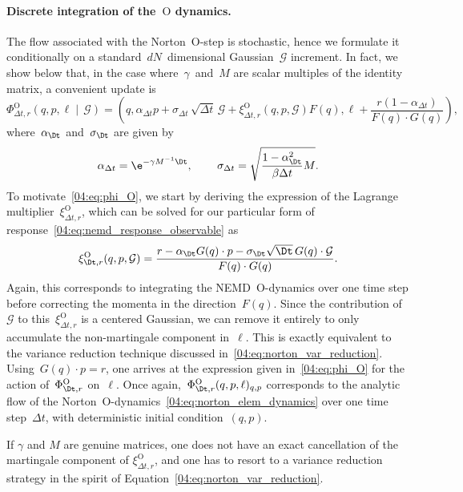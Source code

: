 \paragraph{Discrete integration of the~$\mathrm O$ dynamics.}
The flow associated with the Norton~$\mathrm{O}$-step is stochastic, hence we formulate it conditionally on a standard~$dN$~dimensional Gaussian~$\mathcal{G}$ increment. In fact, we show below that, in the case where~$\gamma$~and~$M$ are scalar multiples of the identity matrix, a convenient update is
\begin{equation}
    \label{04:eq:phi_O}
    {
    \Phi_{\Delta t,r}^{\mathrm{O}}
        \left(q,p,\ell \middle|\, \mathcal G \right)=
        \left(
        q,\alpha_{\Delta t}p + \sigma_{\Delta t}\,\sqrt{\Delta t}\, \mathcal{G} + \xi_{\Delta t,r}^{\mathrm{O}}(q,p,\mathcal G) F(q),\ell + \frac{r(1-\alpha_{\Delta t})}{F(q)\cdot G(q)}
        \right)}
    ,
\end{equation}
where~$\alpha_{\Dt}$ and~$\sigma_{\Dt}$ are given by \[\alpha_{\Delta t} = \e^{-\gamma M^{-1}\Dt},\,\qquad \sigma_{\Delta t} = \sqrt{\frac{1-\alpha_{\Dt}^2}{\beta\Delta t}M}.\]
To motivate~\eqref{04:eq:phi_O}, we start by deriving the expression of the Lagrange multiplier~$\xi_{\Delta t,r}^{\mathrm{O}}$, which can be solved for our particular form of response~\eqref{04:eq:nemd_response_observable} as
\begin{equation}
    \label{04:eq:xi_O}
    \xi_{\Dt,r}^{\mathrm{O}}(q,p,\mathcal G) = \frac{r - \alpha_{\Dt}G(q)\cdot p -\sigma_{\Dt}\sqrt{\Dt} \, G(q)\cdot {\mathcal G} }{F(q)\cdot G(q)}.
\end{equation}
Again, this corresponds to integrating the NEMD~$\mathrm{O}$-dynamics over one time step before correcting the momenta in the direction~$F(q)$. Since the contribution of~$\mathcal{G}$ to this~$\xi_{\Delta t,r}^{\mathrm O}$ is a centered Gaussian, we can remove it entirely to only accumulate the non-martingale component in~$\ell$. This is exactly equivalent to the variance reduction technique discussed in~\eqref{04:eq:norton_var_reduction}. Using~$G(q)\cdot p = r$, one arrives at the expression given in~\eqref{04:eq:phi_O} for the action of~$\Phi_{\Dt,r}^{\mathrm{O}}$ on~$\ell$. Once again,~$\Phi_{\Dt,r}^{\mathrm{O}}(q,p,\ell)_{q,p}$ corresponds to the analytic flow of the Norton~$\mathrm{O}$-dynamics~\eqref{04:eq:norton_elem_dynamics} over one time step~$\Delta t$, with deterministic initial condition~$(q,p)$.

If $\gamma$ and $M$ are genuine matrices, one does not have an exact cancellation of the martingale component of $\xi^{\mathrm{O}}_{\Delta t,r}$, and one has to resort to a variance reduction strategy in the spirit of Equation~\eqref{04:eq:norton_var_reduction}.
